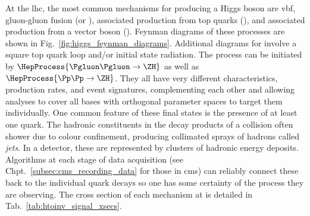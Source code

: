 At the \acrshort{lhc}, the most common mechanisms for producing a Higgs boson are \acrfull{vbf}, gluon-gluon fusion (\ggF or \ggH), associated production from top quarks (\ttH), and associated production from a vector boson (\VH). Feynman diagrams of these processes are shown in Fig.~\ref{fig:higgs_feynman_diagrams}. Additional diagrams for \ggH involve a square top quark loop and/or initial state radiation. The \ZH process can be initiated by $\HepProcess{\Pgluon\Pgluon\to \ZH}$ as well as $\HepProcess{\Pp\Pp \to \ZH}$. They all have very different characteristics, production rates, and event signatures, complementing each other and allowing analyses to cover all bases with orthogonal parameter spaces to target them individually. One common feature of these final states is the presence of at least one quark. The hadronic constituents in the decay products of a collision often shower due to colour confinement, producing collimated sprays of hadrons called \emph{\glspl{jet}}. In a detector, these are represented by clusters of hadronic energy deposits. Algorithms at each stage of data acquisition (see Chpt.~\ref{subsec:cms_recording_data} for those in \acrshort{cms}) can reliably connect these back to the individual quark decays so one has some certainty of the process they are observing. The cross section of each mechanism at \comruntwo is detailed in Tab.~\ref{tab:htoinv_signal_xsecs}.

